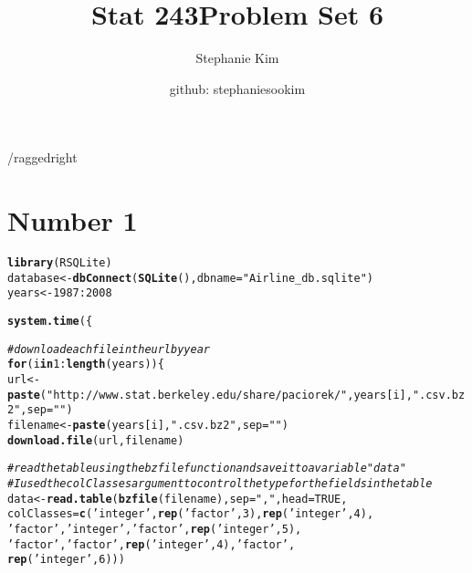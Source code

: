 \documentclass[english]{article}\usepackage[]{graphicx}\usepackage[]{color}
\makeatletter
\newcommand{\hlnum}[1]{\textcolor[rgb]{0.686,0.059,0.569}{#1}}%
\newcommand{\hlstr}[1]{\textcolor[rgb]{0.192,0.494,0.8}{#1}}%
\newcommand{\hlcom}[1]{\textcolor[rgb]{0.678,0.584,0.686}{\textit{#1}}}%
\newcommand{\hlopt}[1]{\textcolor[rgb]{0,0,0}{#1}}%
\newcommand{\hlstd}[1]{\textcolor[rgb]{0.345,0.345,0.345}{#1}}%
\newcommand{\hlkwa}[1]{\textcolor[rgb]{0.161,0.373,0.58}{\textbf{#1}}}%
\newcommand{\hlkwb}[1]{\textcolor[rgb]{0.69,0.353,0.396}{#1}}%
\newcommand{\hlkwc}[1]{\textcolor[rgb]{0.333,0.667,0.333}{#1}}%
\newcommand{\hlkwd}[1]{\textcolor[rgb]{0.737,0.353,0.396}{\textbf{#1}}}%
\newenvironment{kframe}{%
 \def\at@end@of@kframe{}%
 \ifinner\ifhmode%
  \def\at@end@of@kframe{\end{minipage}}%
  \begin{minipage}{\columnwidth}%
 \fi\fi%
 \def\FrameCommand##1{\hskip\@totalleftmargin \hskip-\fboxsep
 \colorbox{shadecolor}{##1}\hskip-\fboxsep
     \hskip-\linewidth \hskip-\@totalleftmargin \hskip\columnwidth}%
 \MakeFramed {\advance\hsize-\width
   \@totalleftmargin\z@ \linewidth\hsize
   \@setminipage}}%
 {\par\unskip\endMakeFramed%
 \at@end@of@kframe}
\newenvironment{knitrout}{}{} %
\makeatother
\begin{document}
\title{Stat 243}


\title{Problem Set 6}


\author{Stephanie Kim}


\author{github: stephaniesookim}

\maketitle
/raggedright


\section*{Number 1}

\begin{knitrout}
\color{fgcolor}\begin{kframe}
\begin{alltt}
\hlkwd{library}\hlstd{(RSQLite)}
\hlstd{database} \hlkwb{<-} \hlkwd{dbConnect}\hlstd{(}\hlkwd{SQLite}\hlstd{(),} \hlkwc{dbname} \hlstd{=} \hlstr{"Airline_db.sqlite"}\hlstd{)}
\hlstd{years} \hlkwb{<-} \hlnum{1987}\hlopt{:}\hlnum{2008}

\hlkwd{system.time}\hlstd{(\{}

\hlcom{# download each file in the url by year}
\hlkwa{for} \hlstd{(i} \hlkwa{in} \hlnum{1}\hlopt{:}\hlkwd{length}\hlstd{(years)) \{}
      \hlstd{url} \hlkwb{<-} \hlkwd{paste}\hlstd{(}\hlstr{"http://www.stat.berkeley.edu/share/paciorek/"}\hlstd{, years[i],} \hlstr{".csv.bz2"}\hlstd{,} \hlkwc{sep}\hlstd{=}\hlstr{""}\hlstd{)}
      \hlstd{filename} \hlkwb{<-} \hlkwd{paste}\hlstd{(years[i],} \hlstr{".csv.bz2"}\hlstd{,} \hlkwc{sep}\hlstd{=}\hlstr{""}\hlstd{)}
      \hlkwd{download.file}\hlstd{(url, filename)}

\hlcom{# read the table using the bzfile function and save it to a variable "data"}
\hlcom{# I used the colClasses argument to control the type for the fields in the table}
      \hlstd{data} \hlkwb{<-} \hlkwd{read.table}\hlstd{(}\hlkwd{bzfile}\hlstd{(filename),} \hlkwc{sep} \hlstd{=} \hlstr{","}\hlstd{,} \hlkwc{head} \hlstd{=} \hlnum{TRUE}\hlstd{,}
                                \hlkwc{colClasses} \hlstd{=} \hlkwd{c}\hlstd{(}\hlstr{'integer'}\hlstd{,} \hlkwd{rep}\hlstd{(}\hlstr{'factor'}\hlstd{,} \hlnum{3}\hlstd{),} \hlkwd{rep}\hlstd{(}\hlstr{'integer'}\hlstd{,} \hlnum{4}\hlstd{),}
                                               \hlstr{'factor'}\hlstd{,} \hlstr{'integer'}\hlstd{,} \hlstr{'factor'}\hlstd{,} \hlkwd{rep}\hlstd{(}\hlstr{'integer'}\hlstd{,}\hlnum{5}\hlstd{),}
                                               \hlstr{'factor'}\hlstd{,} \hlstr{'factor'}\hlstd{,} \hlkwd{rep}\hlstd{(}\hlstr{'integer'}\hlstd{,} \hlnum{4}\hlstd{),} \hlstr{'factor'}\hlstd{,}
                                               \hlkwd{rep}\hlstd{(}\hlstr{'integer'}\hlstd{,} \hlnum{6}\hlstd{)))}


\end{alltt}
\end{kframe}
\end{knitrout}
\end{document}
